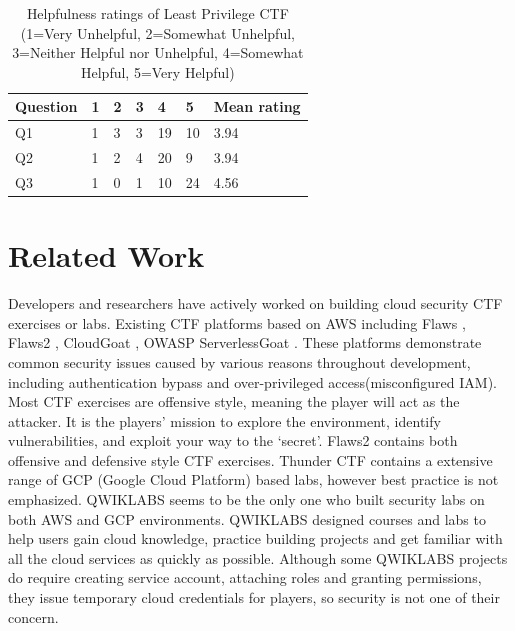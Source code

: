 \documentclass[sigconf]{acmart}
\begin{document}
\begin{table}[t]
    \begin{center}
    \begin{tabular}{|l|l|l|l|l|l|l|}
    \hline
    Question & 1 & 2 & 3 & 4 & 5 &Mean rating\\
    \hline
    \hline
    Q1 & 1 & 3 & 3 & 19 & 10 & 3.94\\ %
    \hline
    Q2 & 1 & 2 & 4 & 20 & 9 & 3.94\\ %
    \hline
    Q3 & 1 & 0 & 1 & 10 & 24 & 4.56\\ %
    \hline
    \end{tabular}
    \caption{Helpfulness ratings of Least Privilege CTF (1=Very Unhelpful, 2=Somewhat Unhelpful, 3=Neither Helpful nor Unhelpful, 4=Somewhat Helpful, 5=Very Helpful)}
    \vspace{-0.20in}
    \label{table:data}
    \end{center}
\end{table}

\section{Related Work}

Developers and researchers have actively worked on building cloud security CTF exercises or labs. Existing CTF platforms based on AWS including Flaws \cite{flaws}, Flaws2 \cite{flaws2}, CloudGoat \cite{cloudgoat}, OWASP ServerlessGoat \cite{serverlessgoat}. These platforms  demonstrate common security issues caused by various reasons throughout development, including authentication bypass and over-privileged access(misconfigured IAM). Most CTF exercises are offensive style, meaning the player will act as the attacker. It is the players’ mission to explore the environment, identify vulnerabilities, and exploit your way to the ‘secret’. Flaws2 contains both offensive and defensive style CTF exercises. Thunder CTF \cite{thunder-ctf} contains a extensive range of GCP (Google Cloud Platform) based labs, however best practice is not emphasized. QWIKLABS \cite{QWIKLABS} seems to be the only one who built security labs on both AWS and GCP environments. QWIKLABS designed courses and labs to help users gain cloud knowledge, practice building projects and get familiar with all the cloud services as quickly as possible. Although some QWIKLABS projects do require creating service account, attaching roles and granting permissions,  they issue temporary cloud credentials for players, so security is not one of their concern.
\end{document}
